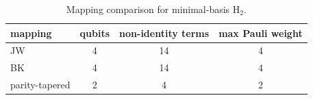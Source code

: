 \begin{table}[H]
\centering\small
\begin{tabular}{lccc}
\toprule
mapping & qubits & non-identity terms & max Pauli weight \\
\midrule
JW & 4 & 14 & 4 \\
BK & 4 & 14 & 4 \\
parity-tapered & 2 & 4 & 2 \\
\bottomrule
\end{tabular}
\caption{Mapping comparison for minimal-basis H$_2$.}
\end{table}
